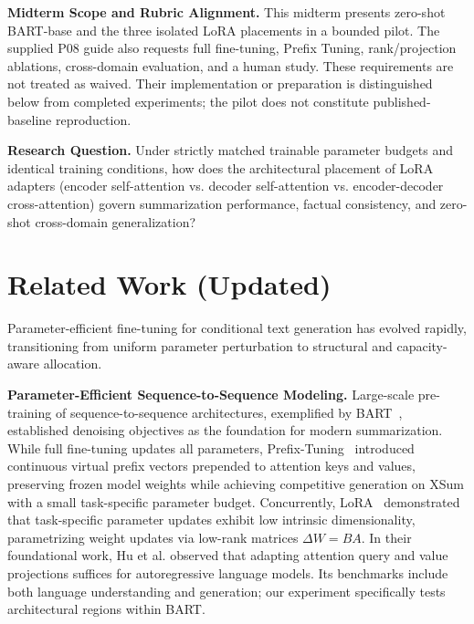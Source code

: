 \documentclass[11pt, letterpaper]{article}
\begin{document}
\textbf{Midterm Scope and Rubric Alignment.} This midterm presents zero-shot
BART-base and the three isolated LoRA placements in a bounded pilot. The supplied
P08 guide also requests full fine-tuning, Prefix Tuning, rank/projection ablations,
cross-domain evaluation, and a human study. These requirements are not treated as
waived. Their implementation or preparation is distinguished below from completed
experiments; the pilot does not constitute published-baseline reproduction.

\textbf{Research Question.} Under strictly matched trainable parameter budgets and identical training conditions, how does the architectural placement of LoRA adapters (encoder self-attention vs. decoder self-attention vs. encoder-decoder cross-attention) govern summarization performance, factual consistency, and zero-shot cross-domain generalization?

\section{Related Work (Updated)}
Parameter-efficient fine-tuning for conditional text generation has evolved rapidly, transitioning from uniform parameter perturbation to structural and capacity-aware allocation.

\textbf{Parameter-Efficient Sequence-to-Sequence Modeling.} Large-scale pre-training of sequence-to-sequence architectures, exemplified by BART~\cite{lewis2020bart}, established denoising objectives as the foundation for modern summarization. While full fine-tuning updates all parameters, Prefix-Tuning~\cite{li2021prefix} introduced continuous virtual prefix vectors prepended to attention keys and values, preserving frozen model weights while achieving competitive generation on XSum with a small task-specific parameter budget. Concurrently, LoRA~\cite{hu2022lora} demonstrated that task-specific parameter updates exhibit low intrinsic dimensionality, parametrizing weight updates via low-rank matrices $\Delta W = BA$. In their foundational work, Hu et al. observed that adapting attention query and value projections suffices for autoregressive language models. Its benchmarks include both language understanding and generation; our experiment specifically tests architectural regions within BART.
\end{document}
